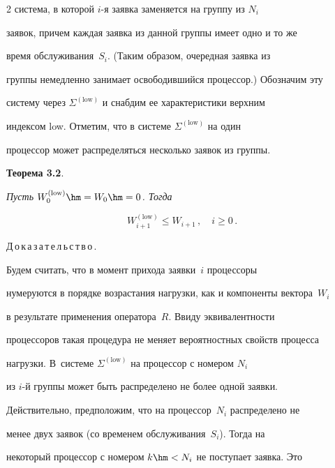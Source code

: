 \begin{multicols}{2}
система, в которой $i$-я заявка заменяется на группу из  $N_{i}$

заявок, причем каждая заявка  из данной группы  имеет одно и то же

время обслуживания~$S_{i}$. (Таким образом, очередная заявка из

группы немедленно занимает освободившийся процессор.) Обозначим эту

систему через $\Sigma^{(\mathrm{low})}$ и снабдим ее характеристики верхним

индексом low. Отметим, что в системе $\Sigma^{(\mathrm{low})}$   на один

процессор может распределяться  несколько заявок  из группы.



\medskip



\noindent

\textbf{Теорема 3.2}. 

\textit{Пусть $W_0^{(\mathrm{low})}\hm=W_0\hm=0$. Тогда}

\begin{equation}

W_{i+1}^{(\mathrm{low})}\leqslant W_{i+1}\,,\quad i\ge 0\,.\label{e9-mr}

\end{equation}



\medskip



\noindent

Д\,о\,к\,а\,з\,а\,т\,е\,л\,ь\,с\,т\,в\,о\,.\

Будем считать, что в момент прихода  заявки~$i$ процессоры

нумеруются в порядке возрастания нагрузки,  как и компоненты вектора~$W_i$ 

в результате применения оператора~$R$. Ввиду эквивалентности

процессоров такая процедура не меняет вероятностных свойств процесса

нагрузки. В~сис\-те\-ме  $\Sigma^{(\mathrm{low})}$ на процессор с номером $N_{i}$

из  $i$-й группы  может быть распределено не более одной заявки.

Действительно, предположим, что на процессор~$N_{i}$ распределено не

менее двух заявок (со временем обслуживания~$S_{i}$). Тогда на

некоторый процессор с номером $k\hm<N_{i}$ не поступает  заявка. Это


\end{multicols}
